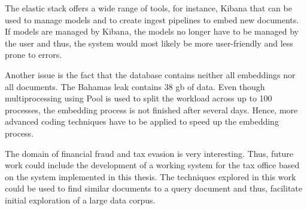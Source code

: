 The elastic stack offers a wide range of tools, for instance, Kibana that can be used to manage models and 
to create ingest pipelines to embed new documents.
If models are managed by Kibana, the models no longer have to be managed by the user and thus, 
the system would most likely be more user-friendly and less prone to errors.

Another issue is the fact that the database contains neither all embeddings nor all documents.
The Bahamas leak contains 38 \ac{gb} of data.
Even though multiprocessing using Pool is used to split the workload across up to 100 processes, 
the embedding process is not finished after several days.
Hence, more advanced coding techniques have to be applied to speed up the embedding process.

The domain of financial fraud and tax evasion is very interesting.
Thus, future work could include the development of a working system for the tax office based on the system implemented in this thesis.
The techniques explored in this work could be used to find similar documents to a query document and thus,
facilitate initial exploration of a large data corpus.